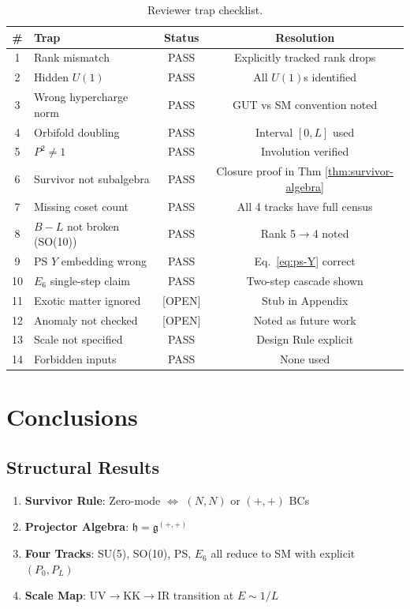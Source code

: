 \documentclass[11pt,a4paper]{article}
\newcommand{\tagOPEN}{\textcolor{red!70!black}{[OPEN]}}
\begin{document}
\begin{table}[h]
\centering
\begin{tabular}{clcc}
\toprule
\# & Trap & Status & Resolution \\
\midrule
1 & Rank mismatch & PASS & Explicitly tracked rank drops \\
2 & Hidden $U(1)$ & PASS & All $U(1)$s identified \\
3 & Wrong hypercharge norm & PASS & GUT vs SM convention noted \\
4 & Orbifold doubling & PASS & Interval $[0,L]$ used \\
5 & $P^2 \neq 1$ & PASS & Involution verified \\
6 & Survivor not subalgebra & PASS & Closure proof in Thm \ref{thm:survivor-algebra} \\
7 & Missing coset count & PASS & All 4 tracks have full census \\
8 & $B-L$ not broken (SO(10)) & PASS & Rank 5$\to$4 noted \\
9 & PS $Y$ embedding wrong & PASS & Eq.~\eqref{eq:ps-Y} correct \\
10 & $E_6$ single-step claim & PASS & Two-step cascade shown \\
11 & Exotic matter ignored & \tagOPEN & Stub in Appendix \\
12 & Anomaly not checked & \tagOPEN & Noted as future work \\
13 & Scale not specified & PASS & Design Rule explicit \\
14 & Forbidden inputs & PASS & None used \\
\bottomrule
\end{tabular}
\caption{Reviewer trap checklist.}
\label{tab:traps}
\end{table}

\section{Conclusions}

\subsection{Structural Results}

\begin{enumerate}
    \item \textbf{Survivor Rule}: Zero-mode $\Leftrightarrow$ $(N,N)$ or $(+,+)$ BCs
    \item \textbf{Projector Algebra}: $\mathfrak{h} = \mathfrak{g}^{(+,+)}$
    \item \textbf{Four Tracks}: SU(5), SO(10), PS, $E_6$ all reduce to SM with explicit $(P_0, P_L)$
    \item \textbf{Scale Map}: UV$\to$KK$\to$IR transition at $E \sim 1/L$
\end{enumerate}
\end{document}
